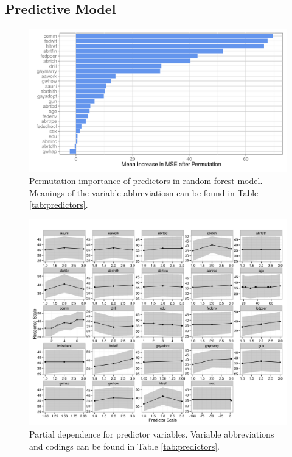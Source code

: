 \subsection{Predictive Model}

\begin{figure}[ht!]
  \centering
  \includegraphics{figures/main/varimp.png}
  \caption{Permutation importance of predictors in random forest model. Meanings of the variable abbreviatiosn can be found in Table \ref{tab:predictors}.}
  \label{fig:imp}
\end{figure}

\begin{figure}[ht!]
  \centering
  \includegraphics{figures/main/partial_dependence.png}
  \caption{Partial dependence for predictor variables. Variable abbreviations and codings can be found in Table \ref{tab:predictors}.}
  \label{fig:pd}
\end{figure}

